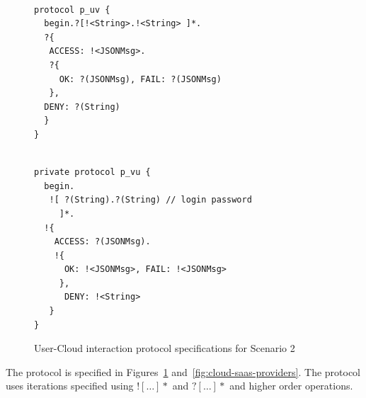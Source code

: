 \documentclass[10pt]{llncs}
\begin{document}
{
\lstset{
  framerule=0pt,
  numbers=none,
  basicstyle=\ttfamily\scriptsize,
}
\renewcommand\lstlistingname{Protocol}
\setcounter{lstlisting}{0}
\begin{figure}

\begin{minipage}[t]{0.50\textwidth}
\begin{lstlisting}[caption=User]

protocol p_uv { 
  begin.?[!<String>.!<String> ]*.
  ?{
   ACCESS: !<JSONMsg>.
   ?{
     OK: ?(JSONMsg), FAIL: ?(JSONMsg)
   },
  DENY: ?(String)
  } 
}

\end{lstlisting}
\end{minipage}
\begin{minipage}[t]{0.50\textwidth}
\begin{lstlisting}[caption=Cloud]

private protocol p_vu { 
  begin.
   ![ ?(String).?(String) // login password
     ]*.
  !{
    ACCESS: ?(JSONMsg).
    !{
      OK: !<JSONMsg>, FAIL: !<JSONMsg>
     },
      DENY: !<String>
   } 
}

\end{lstlisting}
\end{minipage}
\caption{User-Cloud interaction protocol specifications for Scenario 2}\label{fig:user-cloud-protocol} 
\end{figure}

}

The protocol is specified in Figures~\ref{fig:user-cloud-protocol} and~\ref{fig:cloud-saas-providers}.
The protocol uses iterations specified using $![\dots]*$ and $?[\dots]*$ and higher order operations. %
\end{document}
